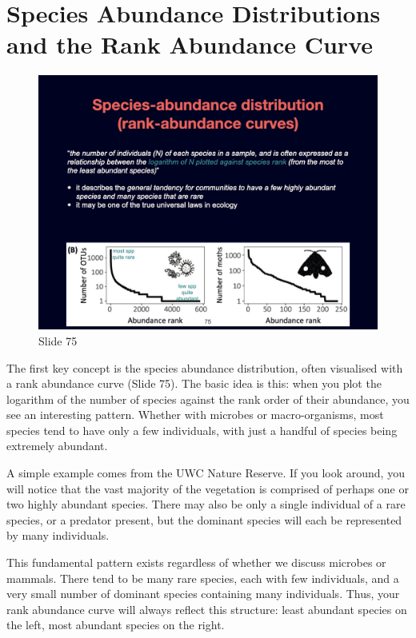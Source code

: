 \documentclass[
  10pt,
]{book}
\begin{document}
\section{Species Abundance Distributions and the Rank Abundance
Curve}\label{species-abundance-distributions-and-the-rank-abundance-curve}

\begin{figure}[ht]
\centering
\includegraphics[width=0.8\linewidth]{../images/BDC334/BDC334-075.jpeg}
\caption*{Slide 75}
\end{figure}

The first key concept is the species abundance distribution, often
visualised with a rank abundance curve (Slide 75). The basic idea is
this: when you plot the logarithm of the number of species against the
rank order of their abundance, you see an interesting pattern. Whether
with microbes or macro-organisms, most species tend to have only a few
individuals, with just a handful of species being extremely abundant.

A simple example comes from the UWC Nature Reserve. If you look around,
you will notice that the vast majority of the vegetation is comprised of
perhaps one or two highly abundant species. There may also be only a
single individual of a rare species, or a predator present, but the
dominant species will each be represented by many individuals.

This fundamental pattern exists regardless of whether we discuss
microbes or mammals. There tend to be many rare species, each with few
individuals, and a very small number of dominant species containing many
individuals. Thus, your rank abundance curve will always reflect this
structure: least abundant species on the left, most abundant species on
the right.
\end{document}
